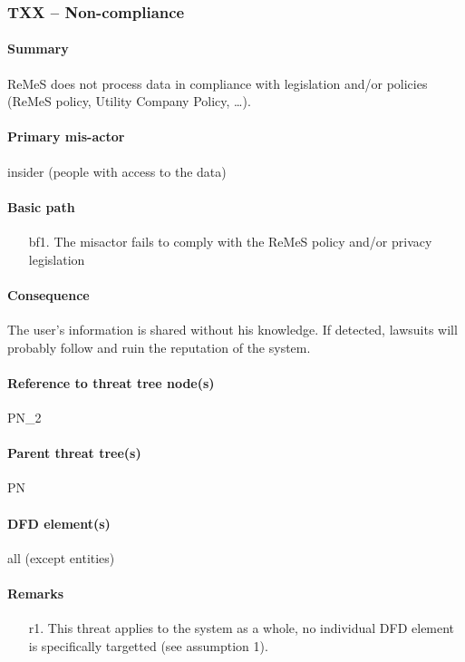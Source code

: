 \subsubsection{TXX -- Non-compliance} %
\paragraph{Summary} ReMeS does not process data in compliance with legislation
and/or policies (ReMeS policy, Utility Company Policy, \ldots).

\paragraph{Primary mis-actor} insider (people with access to the data)

\paragraph{Basic path}
\begin{enumerate}
	\item[bf1.]{The misactor fails to comply with the ReMeS policy and/or
	privacy legislation}
\end{enumerate}

\paragraph{Consequence} The user's information is shared without his knowledge.
If detected, lawsuits will probably follow and ruin the reputation of the
system.

\paragraph{Reference to threat tree node(s)} PN_2

\paragraph{Parent threat tree(s)} PN

\paragraph{DFD element(s)} all (except entities)

\paragraph{Remarks}
\begin{enumerate}
     \item[r1.] This threat applies to the system as a whole, no individual DFD
     element is specifically targetted (see assumption 1).
\end{enumerate}

